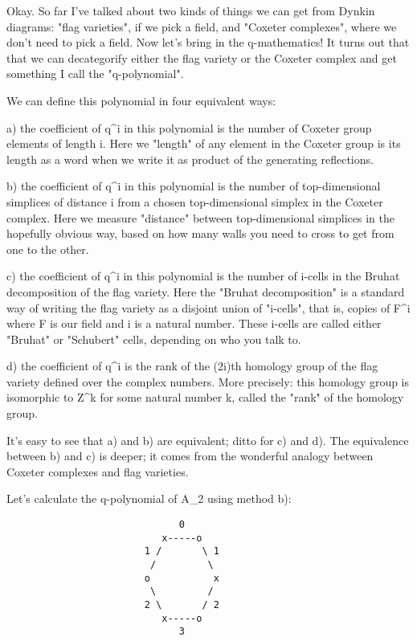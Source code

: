 Okay.  So far I've talked about two kinds of things we can get from
Dynkin diagrams: "flag varieties", if we pick a field, and "Coxeter
complexes", where we don't need to pick a field.  Now let's bring
in the q-mathematics!  It turns out that that we can decategorify 
either the flag variety or the Coxeter complex and get something
I call the "q-polynomial".  

We can define this polynomial in four equivalent ways:

a) the coefficient of q^{i} in this polynomial is the number of
Coxeter group elements of length i.  Here we "length" of any 
element in the Coxeter group is its length as a word when we 
write it as product of the generating reflections.

b) the coefficient of q^{i} in this polynomial is the number of
top-dimensional simplices of distance i from a chosen top-dimensional
simplex in the Coxeter complex.  Here we measure "distance" between
top-dimensional simplices in the hopefully obvious way, based on how 
many walls you need to cross to get from one to the other.

c) the coefficient of q^{i} in this polynomial is the number of
i-cells in the Bruhat decomposition of the flag variety.  Here the
"Bruhat decomposition" is a standard way of writing the flag
variety as a disjoint union of "i-cells", that is, copies of
F^{i} where F is our field and i is a natural number.  These
i-cells are called either "Bruhat" or "Schubert"
cells, depending on who you talk to.

d) the coefficient of q^{i} is the rank of the (2i)th homology group of
the flag variety defined over the complex numbers.  More precisely:
this homology group is isomorphic to Z^{k} for some natural number k,
called the "rank" of the homology group.

It's easy to see that a) and b) are equivalent; ditto for c) and d).
The equivalence between b) and c) is deeper; it comes from the 
wonderful analogy between Coxeter complexes and flag varieties.  

Let's calculate the q-polynomial of A_{2} using method b):
                
\begin{verbatim}
                              0
                           x-----o
                        1 /       \ 1
                         /         \
                        o           x
                         \         /
                        2 \       / 2
                           x-----o
                              3
\end{verbatim}
    
